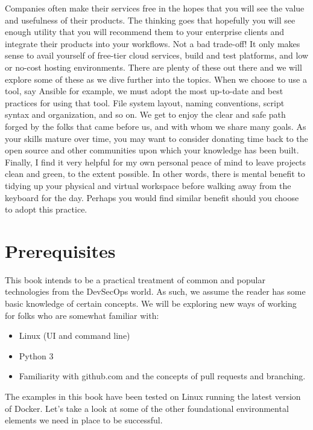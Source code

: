 \justify{}
Companies often make their services free in the hopes that you will see the
value and usefulness of their products. The thinking goes that hopefully
you will see enough utility that you will recommend them to your
enterprise clients and integrate their products into your workflows.
Not a bad trade-off! It only makes sense to avail yourself of free-tier
cloud services, build and test platforms, and low or no-cost hosting
environments. There are plenty of these out there and we will explore
some of these as we dive further into the topics.
\justify{}
When we choose to use a tool, say Ansible for example, we must adopt the
most up-to-date and best practices for using that tool.
File system layout, naming conventions, script syntax and organization,
and so on. We get to enjoy the clear and safe path forged by the folks
that came before us, and with whom we share many goals. As your skills
mature over time, you may want to consider donating time back to the
open source and other communities upon which your knowledge has been
built.
\justify{}
Finally, I find it very helpful for my own personal peace of mind to
leave projects clean and green, to the extent possible. In other words,
there is mental benefit to tidying up your physical and virtual workspace
before walking away from the keyboard for the day. Perhaps you would
find similar benefit should you choose to adopt this practice.
\section{Prerequisites}
\justify{}
This book intends to be a practical treatment of common and popular technologies
from the DevSecOps world. As such, we assume the reader has some basic knowledge
of certain concepts. We will be exploring new ways of working for folks who
are somewhat familiar with:
\begin{itemize}
	\item
	    Linux (UI and command line)
	\item 
		Python 3
	\item
	    Familiarity with github.com and the concepts of pull requests and branching.
\end{itemize}
\justify{}
The examples in this book have been tested on Linux running the latest
version of Docker.
\justify{}
Let's take a look at some of the other foundational environmental
elements we need in place to be successful.
